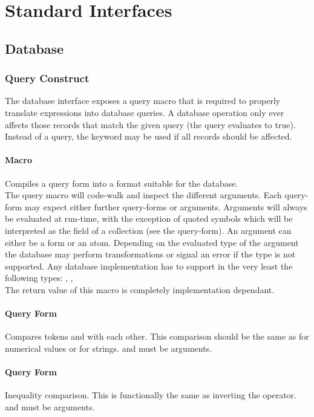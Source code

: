 \chapter{Standard Interfaces} \label{sec:standard interfaces}
\section{Database}
\subsection{Query Construct}
The database interface exposes a query macro that is required to properly translate expressions into database queries. A database operation only ever affects those records that match the given query (the query evaluates to true). Instead of a query, the  keyword may be used if all records should be affected.

\subsubsection{Macro }
Compiles a query form into a format suitable for the database. \\

The query macro will code-walk and inspect the different arguments. Each query-form may expect either further query-forms or arguments. Arguments will always be evaluated at run-time, with the exception of quoted symbols which will be interpreted as the field of a collection (see the  query-form). An argument can either be a form or an atom. Depending on the evaluated type of the argument the database may perform transformations or signal an error if the type is not supported. Any database implementation has to support in the very least the following types: , ,  \\

The return value of this macro is completely implementation dependant.
\subsubsection{Query Form \inline{:=}}
Compares tokens  and  with each other. This comparison should be the same as  for numerical values or  for strings.  and  must be arguments.
\subsubsection{Query Form \inline{:!=}}
Inequality comparison. This is functionally the same as inverting the \inline{=} operator.  and  must be arguments.
